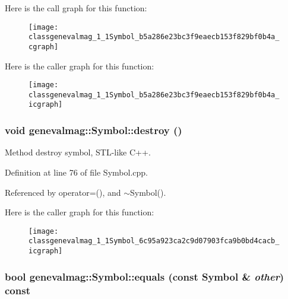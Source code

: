 Here is the call graph for this function:\nopagebreak
\begin{figure}[H]
\begin{center}
\leavevmode
\texttt{[image: classgenevalmag\_1\_1Symbol\_b5a286e23bc3f9eaecb153f829bf0b4a\_cgraph]}
\end{center}
\end{figure}


Here is the caller graph for this function:\nopagebreak
\begin{figure}[H]
\begin{center}
\leavevmode
\texttt{[image: classgenevalmag\_1\_1Symbol\_b5a286e23bc3f9eaecb153f829bf0b4a\_icgraph]}
\end{center}
\end{figure}
\hypertarget{classgenevalmag_1_1Symbol_6c95a923ca2c9d07903fca9b0bd4cacb}{
\subsubsection[{destroy}]{\setlength{\rightskip}{0pt plus 5cm}void genevalmag::Symbol::destroy ()}}
\label{classgenevalmag_1_1Symbol_6c95a923ca2c9d07903fca9b0bd4cacb}


Method destroy symbol, STL-like C++. 

Definition at line 76 of file Symbol.cpp.

Referenced by operator=(), and $\sim$Symbol().

Here is the caller graph for this function:\nopagebreak
\begin{figure}[H]
\begin{center}
\leavevmode
\texttt{[image: classgenevalmag\_1\_1Symbol\_6c95a923ca2c9d07903fca9b0bd4cacb\_icgraph]}
\end{center}
\end{figure}
\hypertarget{classgenevalmag_1_1Symbol_17e303be01f4c9cd3c1b167179d6e0aa}{
\subsubsection[{equals}]{\setlength{\rightskip}{0pt plus 5cm}bool genevalmag::Symbol::equals (const {\bf Symbol} \& {\em other}) const}}
\label{classgenevalmag_1_1Symbol_17e303be01f4c9cd3c1b167179d6e0aa}


